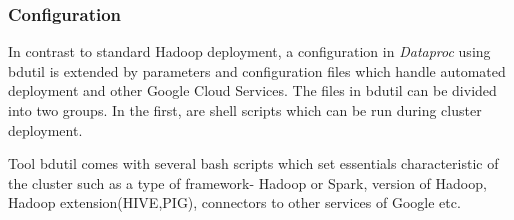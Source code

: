 \documentclass[a4paper,12pt,oneside]{report}
\begin{document}
\subsubsection{Configuration}
In contrast to standard Hadoop deployment, a configuration in \textit{Dataproc} using bdutil is 
extended by parameters and configuration files which handle automated deployment and other Google
Cloud Services. The files in bdutil can be divided into two groups. In the first,  are shell scripts 
which can be run during cluster deployment.

Tool bdutil comes with several bash scripts which set essentials characteristic of the cluster 
such as a type of framework- Hadoop or Spark, version of Hadoop, Hadoop extension(HIVE,PIG), 
connectors to other services of Google etc.


\end{document}
